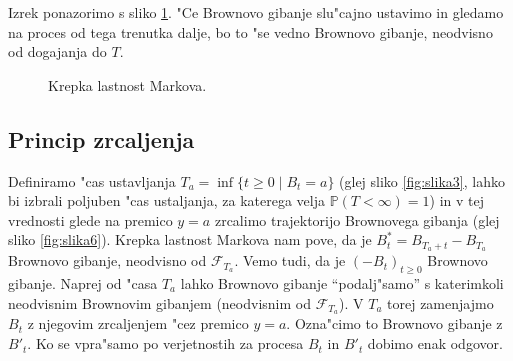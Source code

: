 \documentclass[twoside,11pt]{article}
\begin{document}
\pagebreak
Izrek ponazorimo s sliko \ref{fig:slika5}. "Ce Brownovo gibanje slu"cajno ustavimo in gledamo na proces od tega trenutka dalje, bo to "se vedno Brownovo gibanje, neodvisno od dogajanja do $T$. 

\begin{figure}[h]
    \centering
    \caption{Krepka lastnost Markova.}
    \label{fig:slika5}
\end{figure}


\subsection{Princip zrcaljenja}

Definiramo "cas ustavljanja $T_a = \inf\{t \geq 0 \mid B_t = a\}$ (glej sliko \ref{fig:slika3}, lahko bi izbrali poljuben "cas ustaljanja, za katerega velja $\mathbb{P}(T < \infty) = 1$) in v tej vrednosti glede na premico $y = a$ zrcalimo trajektorijo Brownovega gibanja (glej sliko \ref{fig:slika6}). 
Krepka lastnost Markova nam pove, da je $B^*_t = B_{T_a + t} - B_{T_a}$ Brownovo gibanje, neodvisno od $\mathcal{F}_{T_a}$. Vemo tudi, da je $(-B_t)_{t\geq0}$ Brownovo gibanje. Naprej od "casa $T_a$ lahko Brownovo gibanje ``podalj"samo'' s katerimkoli neodvisnim Brownovim gibanjem (neodvisnim od $\mathcal{F}_{T_a}$). V $T_a$ torej zamenjajmo $B_t$ z njegovim zrcaljenjem "cez premico $y = a$. Ozna"cimo to Brownovo gibanje z $B'_t$. Ko se vpra"samo po verjetnostih za procesa $B_t$ in $B'_t$ dobimo enak odgovor.
\end{document}

